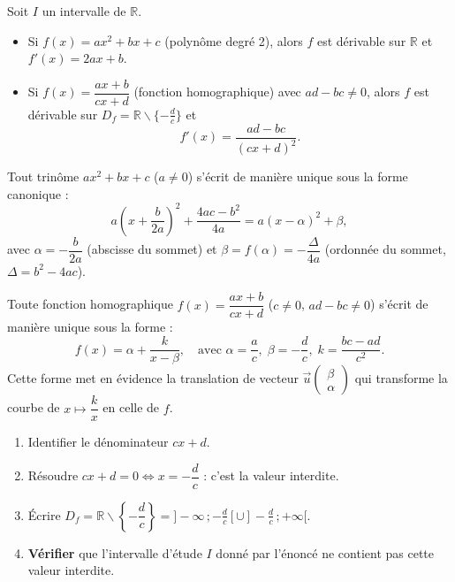 \documentclass[11pt]{article}
\newcommand{\cle}[1]{{\popxbold\color{popdark}#1}}
\def\setminus{\mathbin{\backslash}}\let\smallsetminus\setminus
\begin{document}
\begin{definition}
Soit $I$ un intervalle de $\mathbb{R}$.
\begin{itemize}
\item Si $f(x)=ax^2+bx+c$ (polynôme degré 2), alors $f$ est dérivable sur $\mathbb{R}$ et $f'(x)=2ax+b$.
\item Si $f(x)=\dfrac{ax+b}{cx+d}$ (fonction homographique) avec $ad-bc\neq0$, alors $f$ est dérivable sur $D_f=\mathbb{R}\setminus\{-\frac{d}{c}\}$ et
\[f'(x)=\frac{ad-bc}{(cx+d)^2}.\]
\end{itemize}
\end{definition}

\begin{propriete}
Tout trinôme $ax^2+bx+c$ ($a\neq0$) s'écrit de manière unique sous la forme canonique :
\[a\left(x+\frac{b}{2a}\right)^2+\frac{4ac-b^2}{4a}=a(x-\alpha)^2+\beta,\]
avec $\alpha=-\dfrac{b}{2a}$ (abscisse du sommet) et $\beta=f(\alpha)=-\dfrac{\Delta}{4a}$ (ordonnée du sommet, $\Delta=b^2-4ac$).
\end{propriete}

\begin{propriete}
Toute fonction homographique $f(x)=\dfrac{ax+b}{cx+d}$ ($c\neq0$, $ad-bc\neq0$) s'écrit de manière unique sous la forme :
\[f(x)=\alpha+\frac{k}{x-\beta},\quad\text{avec }\alpha=\frac{a}{c},\;\beta=-\frac{d}{c},\;k=\frac{bc-ad}{c^2}.\]
Cette forme met en évidence la translation de vecteur $\vec{u}\begin{pmatrix}\beta\\ \alpha\end{pmatrix}$ qui transforme la courbe de $x\mapsto\dfrac{k}{x}$ en celle de $f$.
\end{propriete}

\begin{methode}
\begin{enumerate}
\item Identifier le dénominateur $cx+d$.
\item Résoudre $cx+d=0 \iff x=-\dfrac{d}{c}$ : c'est la \cle{valeur interdite}.
\item Écrire $D_f=\mathbb{R}\setminus\left\{-\dfrac{d}{c}\right\}=]-\infty\,;-\frac{d}{c}[\cup]-\frac{d}{c}\,;+\infty[$.
\item \textbf{Vérifier} que l'intervalle d'étude $I$ donné par l'énoncé ne contient pas cette valeur interdite.
\end{enumerate}
\end{methode}
\end{document}
